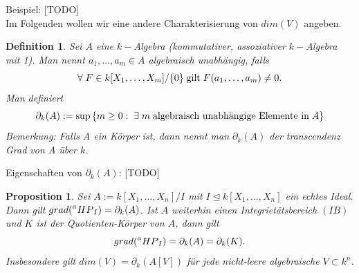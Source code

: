 \documentclass{article}
\newtheorem{definition}[satz]{Definition}
\newtheorem{proposition}[satz]{Proposition}
\newcommand*{\R}{k[X_{1},\ldots,X_{n}]}
\newcommand*{\indx}[2]{{#1}_{#2}}
\newcommand*{\hp}[1]{$\prescript{a}{}{HP}_{#1}$}
\begin{document}
Beispiel: [TODO]\\

Im Folgenden wollen wir eine andere Charakterisierung von $dim(V)$ angeben. 
\begin{definition}
	Sei $A$ eine $k-$Algebra (kommutativer, assoziativer $k-$Algebra mit 1). Man nennt $\indx{a}{1},\ldots,\indx{a}{m}\in A$ algebraisch unabhängig, falls 
	\begin{displaymath}
	\forall \;F\in k[\indx{X}{1},\ldots,\indx{X}{m}]/\{0\} \;\textnormal{gilt}\; F(\indx{a}{1},\ldots,\indx{a}{m})\neq0.
	\end{displaymath}
	Man definiert
	\begin{displaymath}
	\indx{\partial}{k}(A):=\sup{\{m\geq0:\;\exists\; m \;\textnormal{algebraisch unabhängige Elemente in}\; A\}}
	\end{displaymath}
Bemerkung: Falls A ein Körper ist, dann nennt man $\indx{\partial}{k}(A)$ der transcendenz Grad von $A$ über $k$.\\
\end{definition}


Eigenschaften von $\indx{\partial}{k}(A)$: [TODO]\\

\begin{proposition}
	Sei $A:=\R/I$ mit $I\unlhd\R$ ein echtes Ideal. Dann gilt $grad(\textnormal{\hp{I}})=\indx{\partial}{k}(A)$. Ist $A$ weiterhin einen Integrietätsbereich $(IB)$ und $K$ ist der Quotienten-Körper von $A$, dann gilt
	\begin{displaymath}
	grad(\textnormal{\hp{I}})=\indx{\partial}{k}(A)=\indx{\partial}{k}(K).
	\end{displaymath}
	Insbesondere gilt $dim(V)=\indx{\partial}{k}(A[V])$ für jede nicht-leere algebraische $V\subset k^n$.\\
\end{proposition}
\end{document}
